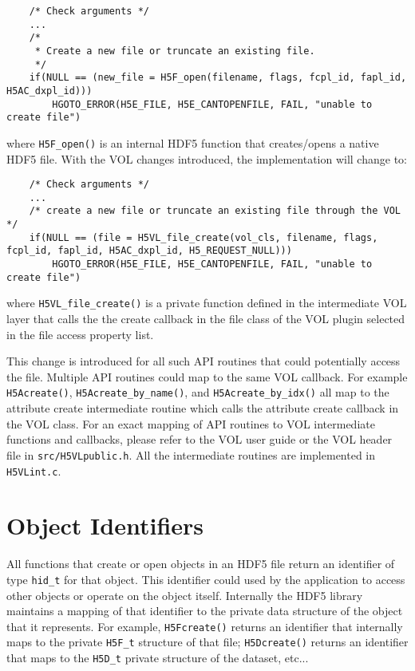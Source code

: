\begin{lstlisting}
    /* Check arguments */
    ...
    /*                                                                                                                                                                                                                                       
     * Create a new file or truncate an existing file.                                                                                                                                                                                       
     */
    if(NULL == (new_file = H5F_open(filename, flags, fcpl_id, fapl_id, H5AC_dxpl_id)))
        HGOTO_ERROR(H5E_FILE, H5E_CANTOPENFILE, FAIL, "unable to create file")
\end{lstlisting}

where {\tt H5F\_open()} is an internal HDF5 function that creates/opens a native HDF5 file. With the VOL changes introduced, the implementation will change to:

\begin{lstlisting}
    /* Check arguments */
    ...
    /* create a new file or truncate an existing file through the VOL */
    if(NULL == (file = H5VL_file_create(vol_cls, filename, flags, fcpl_id, fapl_id, H5AC_dxpl_id, H5_REQUEST_NULL)))
        HGOTO_ERROR(H5E_FILE, H5E_CANTOPENFILE, FAIL, "unable to create file")
\end{lstlisting}

where {\tt H5VL\_file\_create()} is a private function defined in the intermediate VOL layer that calls the the create callback in the file class of the VOL plugin selected in the file access property list.

This change is introduced for all such API routines that could potentially access the file. Multiple API routines could map to the same VOL callback. For example {\tt H5Acreate()}, {\tt H5Acreate\_by\_name()}, and {\tt H5Acreate\_by\_idx()} all map to the attribute create intermediate routine which calls the attribute create callback in the VOL class. For an exact mapping of API routines to VOL intermediate functions and callbacks, please refer to the VOL user guide or the VOL header file in {\tt src/H5VLpublic.h}. All the intermediate routines are implemented in {\tt H5VLint.c}.

\section{Object Identifiers}
All functions that create or open objects in an HDF5 file return an identifier of type {\tt hid\_t} for that object. This identifier could used by the application to access other objects or operate on the object itself. Internally the HDF5 library maintains a mapping of that identifier to the private data structure of the object that it represents. For example, {\tt H5Fcreate()} returns an identifier that internally maps to the private {\tt H5F\_t} structure of that file; {\tt H5Dcreate()} returns an identifier that maps to the {\tt H5D\_t} private structure of the dataset, etc... 

